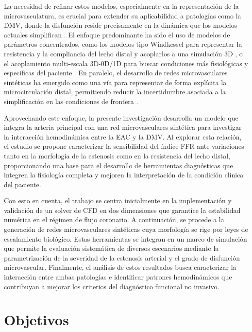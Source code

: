 \documentclass[12pt, letterpaper]{article}
\begin{document}
La necesidad de refinar estos modelos, especialmente en la representación de la microvasculatura, es crucial para extender su aplicabilidad a patologías como la DMV, donde la disfunción reside precisamente en la dinámica que los modelos actuales simplifican \cite{kunadian_eapci_2021}. El enfoque predominante ha sido el uso de modelos de parámetros concentrados, como los modelos tipo Windkessel para representar la resistencia y la compliancia del lecho distal y acoplarlos a una simulación 3D \cite{duanmu_patient-specific_2018,nannini_automated_2024}, o el acoplamiento multi-escala 3D-0D/1D para buscar condiciones más fisiológicas y específicas del paciente \cite{duanmu_patient-specific_2018,nannini_automated_2024}. En paralelo, el desarrollo de redes microvasculares sintéticas ha emergido como una vía para representar de forma explícita la microcirculación distal, permitiendo reducir la incertidumbre asociada a la simplificación en las condiciones de frontera \cite{nannini_automated_2024}.

Aprovechando este enfoque, la presente investigación desarrolla un modelo que integra la arteria principal con una red microvasculares sintética para investigar la interacción hemodinámica entre la EAC y la DMV. Al explorar esta relación, el estudio se propone caracterizar la sensibilidad del índice FFR ante variaciones tanto en la morfología de la estenosis como en la resistencia del lecho distal, proporcionando una base para el desarrollo de herramientas diagnósticas que integren la fisiología completa y mejoren la interpretación de la condición clínica del paciente.

Con esto en cuenta, el trabajo se centra inicialmente en la implementación y validación de un solver de CFD en dos dimensiones que garantice la estabilidad numérica en el régimen de flujo coronario. A continuación, se procede a la generación de redes microvasculares sintéticas cuya morfología se rige por leyes de escalamiento biológico. Estas herramientas se integran en un marco de simulación que permite la evaluación sistemática de diversos escenarios mediante la parametrización de la severidad de la estenosis arterial y el grado de disfunción microvascular. Finalmente, el análisis de estos resultados busca caracterizar la interacción entre ambas patologías e identificar patrones hemodinámicos que contribuyan a mejorar los criterios del diagnóstico funcional no invasivo.

\section{Objetivos}
\end{document}
